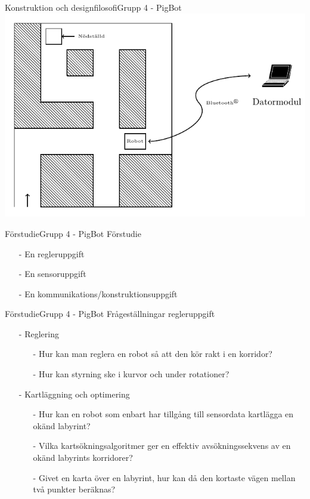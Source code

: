 \begin{frame}{Konstruktion och designfilosofi}{Grupp 4 - PigBot}
\centering
    \includegraphics[scale=0.7]{images/overview.pdf}
\end{frame}


\begin{frame}{Förstudie}{Grupp 4 - PigBot}
Förstudie
\pause
  \begin{itemize}
    \item[-] En regleruppgift
    \item[-] En sensoruppgift 
    \item[-] En kommunikations/konstruktionsuppgift
  \end{itemize}
\end{frame}


\begin{frame}{Förstudie}{Grupp 4 - PigBot}
Frågeställningar regleruppgift
  \begin{itemize}
\pause
    \item[-] Reglering
\pause
\begin{itemize}
	\item [-] Hur kan man reglera en robot så att den kör rakt i en korridor?
	\item [-] Hur kan styrning ske i kurvor och under rotationer?
\end{itemize}
\pause
    \item[-] Kartläggning och optimering 
\begin{itemize}
	\item [-] Hur kan en robot som enbart har tillgång till sensordata kartlägga en okänd labyrint?
	\item [-] Vilka kartsökningsalgoritmer ger en effektiv avsökningssekvens av en okänd labyrints korridorer?
	\item [-] Givet en karta över en labyrint, hur kan då den kortaste vägen mellan två punkter beräknas?
\end{itemize}
  \end{itemize}
\end{frame}

